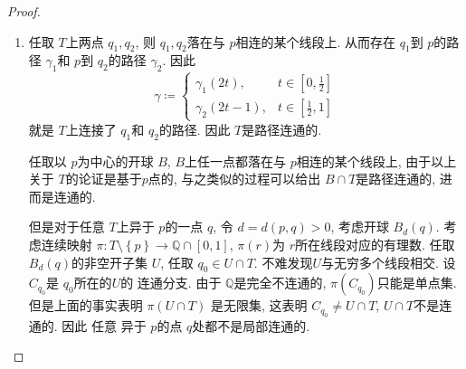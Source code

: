 \documentclass[../main.tex]{subfiles}
\begin{document}
\begin{proof}
    \begin{enumerate}
        \item 任取 \(  T  \)上两点 \(  q_1,q_2  \), 则 \(  q_1,q_2  \)落在与 \(  p  \)相连的某个线段上. 从而存在 \(  q_1  \)到 \(  p  \)的路径 \(   \gamma _1   \)和 \(  p  \)到 \(  q_2  \)的路径 \(   \gamma _2   \). 因此 \[
         \gamma \coloneqq \begin{cases}  \gamma _1 \left( 2t \right),& t\in \left[ 0,\frac{1 }{2 }  \right]\\ 
           \gamma _2 \left( 2t-1 \right),& t\in \left[ \frac{1 }{2 },1  \right]     \end{cases} 
        \]就是 \(  T  \)上连接了 \(  q_1  \)和 \(  q_2  \)的路径. 因此 \(  T  \)是路径连通的.
        
        任取以 \(  p  \)为中心的开球 \(  B  \),  \(  B  \)上任一点都落在与 \(  p  \)相连的某个线段上, 由于以上关于 \(  T  \)的论证是基于\(  p  \)点的,   与之类似的过程可以给出 \(  B  \cap T\)是路径连通的, 进而是连通的.
        
        但是对于任意 \(  T  \)上异于 \(  p  \)的一点 \(  q  \), 令 \(  d = d\left( p,q \right)   > 0\), 考虑开球 \(  B_{d}\left( q \right)   \). 考虑连续映射 \(   \pi:T\setminus \left\{ p \right\}\to \mathbb{Q} \cap \left[ 0,1 \right]   \), \(   \pi\left( r \right)   \)为 \(  r  \)所在线段对应的有理数.   任取 \(  B_{d}\left( q \right)   \)的非空开子集 \(  U  \),    任取 \(  q_0\in U\cap T  \). 不难发现\(  U  \)与无穷多个线段相交. 设 \(  C_{q_0}  \)是 \(  q_0  \)所在的\(  U  \)的 连通分支. 由于 \(  \mathbb{Q}   \)是完全不连通的,  \(   \pi\left( C_{q_0} \right)   \)只能是单点集.     但是上面的事实表明 \(   \pi\left( U\cap T \right)   \) 是无限集, 这表明 \(  C_{q_0}\neq U \cap T \), \(  U\cap T  \)不是连通的. 因此 任意 异于 \(  p  \)的点 \(  q  \)处都不是局部连通的.
        

\end{enumerate}
\end{proof}
\end{document}
